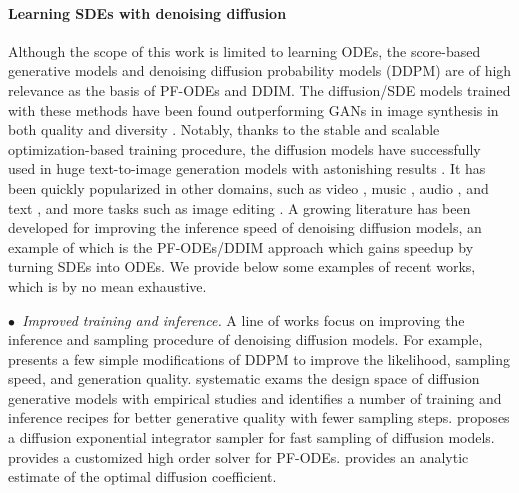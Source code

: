 \paragraph{Learning SDEs with denoising diffusion} 
Although the scope of this work 
is limited to learning ODEs, the  score-based generative models \citep{song2019generative, song2020improved, song2020score, song2021maximum}
and denoising diffusion probability models (DDPM) \citep{ho2020denoising} 
are of high relevance 
as the basis of PF-ODEs and DDIM. 
The diffusion/SDE models trained with these methods have been found outperforming GANs in image synthesis 
in both quality and diversity \cite{dhariwal2021diffusion}. 
Notably,  
thanks to the stable and scalable optimization-based training procedure, 
the diffusion models have successfully used in  huge text-to-image  generation models with astonishing results 
\citep[e.g.,][]{glide, dalle2, imagegen}.  
It has been quickly popularized in other domains, such as
video \citep[e.g.,][]{ho2022video, yang2022diffusion, harvey2022flexible}, 
music \citep{mittal2021symbolic}, audio \citep[e.g.,][]{kong2020diffwave, lee2021nu, popov2021grad}, and text \citep{li2022diffusion, wang2022language}, 
and more tasks such as image editing  \citep{zhao2022egsde, meng2021sdedit}. 
A growing literature has been developed for improving the inference speed of denoising diffusion models, 
an example of which is 
the PF-ODEs/DDIM approach which gains speedup by turning SDEs into ODEs. 
We provide  below some examples of recent works,
which is by no mean  exhaustive. 

\emph{$\bullet$~Improved training and inference.} 
A line of works focus on  improving the inference and sampling procedure of denoising diffusion models. 
For example, 
\cite{nichol2021improved} presents 
a few simple modifications of DDPM to improve the likelihood, sampling speed, and generation quality. 
\cite{elucidating}  systematic exams  the design space of diffusion generative models 
with empirical studies and identifies a number of training and inference recipes 
for better generative quality with fewer sampling steps. 
\cite{zhang2022fast} proposes a diffusion exponential integrator sampler for fast sampling of diffusion models. \cite{lu2022dpm} provides a customized high order solver for PF-ODEs. 
\citep{bao2022analytic} provides an analytic estimate of the optimal diffusion coefficient. 



